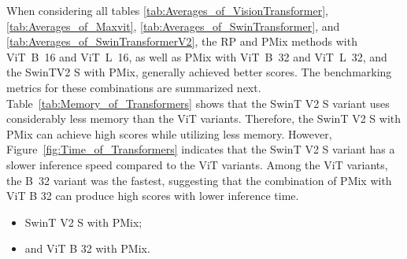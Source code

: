 When considering all tables \ref{tab:Averages_of_VisionTransformer}, \ref{tab:Averages_of_Maxvit}, \ref{tab:Averages_of_SwinTransformer}, and \ref{tab:Averages_of_SwinTransformerV2}, the \gls{RP} and \gls{PMix} methods with \mbox{\gls{ViT} B 16} and \mbox{\gls{ViT} L 16}, as well as \gls{PMix} with \mbox{\gls{ViT} B 32} and \mbox{\gls{ViT} L 32}, and the \gls{SwinTV2} S with \gls{PMix}, generally achieved better scores. The benchmarking metrics for these combinations are summarized next. Table~\ref{tab:Memory_of_Transformers} shows that the \gls{SwinT} V2 S variant uses considerably less memory than the \gls{ViT} variants. Therefore, the \gls{SwinT} V2 S with \gls{PMix} can achieve high scores while utilizing less memory. However, Figure~\ref{fig:Time_of_Transformers} indicates that the \gls{SwinT} V2 S variant has a slower inference speed compared to the \gls{ViT} variants. Among the \gls{ViT} variants, the \mbox{B 32} variant was the fastest, suggesting that the combination of \gls{PMix} with \gls{ViT} B 32 can produce high scores with lower inference time.  
\begin{itemize}
	\item \gls{SwinT} V2 S with \gls{PMix};
	\item and \gls{ViT} B 32 with \gls{PMix}. 
\end{itemize}


